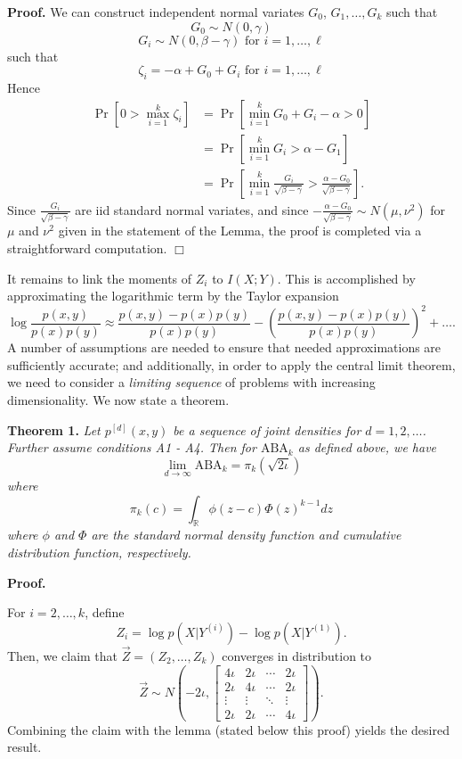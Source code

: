 \textbf{Proof.}
We can construct independent normal variates $G_0$, $G_1,\hdots, G_k$
such that
\[
G_0 \sim N(0, \gamma)
\]
\[
G_i \sim N(0, \beta - \gamma)\text{ for }i =1,\hdots, \ell
\]
such that
\[
\zeta_i = -\alpha + G_0 + G_i \text{ for }i =1,\hdots,\ell
\]
Hence
\begin{align*}
\Pr[0 > \max_{i=1}^k \zeta_i] &= \Pr[\min_{i=1}^{k} G_0 + G_i - \alpha > 0]
\\&= \Pr[\min_{i=1}^{k} G_i > \alpha - G_1]
\\&= \Pr[\min_{i=1}^{k} \frac{G_i}{\sqrt{\beta - \gamma}} > \frac{\alpha - G_0}{\sqrt{\beta - \gamma}}].
\end{align*}
Since $\frac{G_i}{\sqrt{\beta - \gamma}}$ are iid standard normal variates, and since
$-\frac{\alpha - G_0}{\sqrt{\beta - \gamma}} \sim N(\mu,\nu^2)$ for $\mu$ and $\nu^2$ given in the statement of the Lemma, the proof is completed via a straightforward computation.  $\Box$



It remains to link the moments of $Z_i$ to $I(X;Y)$.  This is accomplished by approximating the logarithmic term by the Taylor expansion
\[
\log \frac{p(x, y)}{p(x) p(y)} \approx \frac{p(x, y) - p(x) p(y)}{p(x) p(y)} - \left(\frac{p(x, y) - p(x) p(y)}{p(x) p(y)}\right)^2 + \hdots.
\]
A number of assumptions are needed to ensure that needed
approximations are sufficiently accurate; and additionally, in order
to apply the central limit theorem, we need to consider a
\emph{limiting sequence} of problems with increasing dimensionality.
We now state a theorem.

\textbf{Theorem 1.} \emph{Let $p^{[d]}(x, y)$ be a sequence of joint densities
for $d = 1,2,\hdots$.  Further assume conditions A1 - A4.
Then for $\text{ABA}_k$ as defined above, we have
\[
\lim_{d \to \infty} \text{ABA}_k = \pi_k(\sqrt{2 \iota})
\]
where
\[
\pi_k(c) = \int_{\mathbb{R}} \phi(z - c)  \Phi(z)^{k-1} dz
\]
where $\phi$ and $\Phi$ are the standard normal density function and
cumulative distribution function, respectively.}


\textbf{Proof.}

For $i = 2,\hdots, k$, define
\[
Z_i = \log p(X|Y^{(i)}) - \log p(X|Y^{(1)}).
\]
Then, we claim that $\vec{Z} = (Z_2,\hdots, Z_k)$ converges in distribution to
\[
\vec{Z} \sim N\left(-2\iota, 
\begin{bmatrix}
4\iota & 2\iota & \cdots & 2\iota\\
2\iota & 4\iota & \cdots & 2\iota\\
\vdots & \vdots & \ddots & \vdots\\
2\iota & 2\iota & \cdots & 4\iota
\end{bmatrix}
\right).
\]
Combining the claim with the lemma (stated below this proof) yields the
desired result.

